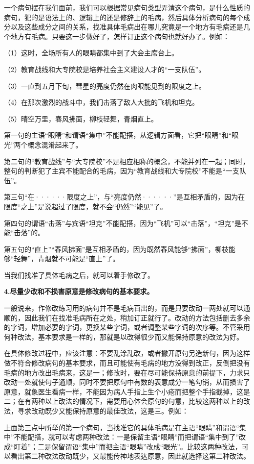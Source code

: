 一个病句摆在我们面前，我们可以根据常见病句类型弄清这个病句，是什么性质的病句，犯的是语法上的、逻辑上的还是修辞上的毛病，然后具体分析病句的每个成分以及这些成分之间的关系，找准具体毛病出在哪儿究竟是一个地方有毛病还是几个地方有毛病。只要这一步做好了，怎样订正这个病句也就好办了。例如：

（1）这时，全场所有人的眼睛都集中到了大会主席台上。

（2）教育战线和大专院校是培养社会主义建设人才的“一支队伍”。

（3）一直到五月下旬，彗星的亮度仍然在肉眼能见到的限度之上。

（4）在那次激烈的战斗中，我们击落了敌人大批的飞机和坦克。

（5）晴空万里，春风拂面，柳枝轻舞，青烟直上。

第一句的主语“眼睛”和谓语“集中”不能配搭，从逻辑方面看，它把“眼睛”和“眼光”两个概念混淆起来了。

第二句的“教育战线”与“大专院校”不是相应相称的概念，不能并列在一起；同时，整句的判断犯了主宾不能配合的毛病，因为“教育战线和大专院校”不能是“一支队伍”。

第三句“在······限度之上”，与“亮度仍然······”是互相矛盾的，因为在限度“之上”是说超过了限度，就不会“仍然”“能见”了。

第四句的谓语“击落”与宾语“坦克”不能配搭，因为“飞机”可以“击落”，“坦克”是不能“击落”的。

第五句的“直上”“春风拂面”是互相矛盾的，因为既然春风能够“拂面”，柳枝能够“轻舞”，青烟就不可能是“直上”了。

当我们找准了具体毛病之后，就可以着手修改了。

\textbf{4.尽量少改和不损害原意是修改病句的基本要求。}

一般说来，作修改练习用的病句并不是毛病百出的，而是只要改动一两处就可以通顺的，因此我们在找准毛病所在之处，稍加订正就行了。改动的方法包括删去多余的字词，增加必要的字词，更换某些字词，或者调整某些字词的次序等。不管采用何种改法，基本要求是一样的，那就是以改得很少而又能保持原意的改法为好。

在具体修改过程中，应该注意：不要乱涂乱改，或者撇开原句另造新句，因为这样做不符合修改病句的基本要求，而且可能使有毛病的地方没得到改正，反倒把没有毛病的地方改出毛病来，这是一；修改时，要在尽可能保持原意的前提下，力求只改动一处就使句子通顺，同时不要把原句中有数的表意成分一笔勾销，从而损害了原意，就象医生看病一样，不能因为病人手指上生个小疮而把整个手指截掉，这是二；在有两种以上改法的情况下，需要用心体会原句的句意，比较这两种以上的改法，寻求改动既少又能保持原意的最佳改法，这是三。例如：

上面第三点中所举的第一个病句，当找准它的具体毛病是在主语“眼睛”和谓语“集中”不能配搭，就可以考虑两种改法：一是保留主语“眼睛”而把谓语“集中到了”改成“盯着”；二是保留谓语“集中”而把主语“眼睛”改成“眼光”。比较这两种改法，可以看出第二种改法改动既少，又最能传神地表达原意，因此就选择这第二种改法。

